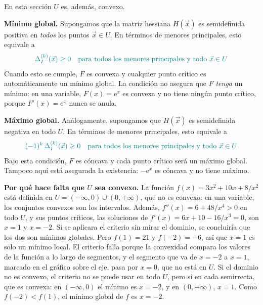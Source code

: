 \documentclass{article}
\newcommand{\vect}[1]{\vec{#1}}
\begin{document}
En esta sección \(U\) es, además, convexo.

\medskip

\noindent\textbf{Mínimo global.}
Supongamos que la matriz hessiana \(H(\vect{x})\) es semidefinida positiva en \emph{todos} los puntos \(\vect{x}\in U\). En términos de menores principales, esto equivale a
\[\color{teal}
\Delta^{(k)}_I(\vect{x})\ge0\quad\text{para todos los menores principales y todo }\vect{x}\in U
\]
Cuando esto se cumple, \(F\) es convexa y cualquier punto crítico es automáticamente un mínimo global. La condición no asegura que \(F\) \emph{tenga} un mínimo: en una variable, \(F(x)=\mathrm{e}^{x}\) es convexa y no tiene ningún punto crítico, porque \(F'(x)=\mathrm{e}^{x}\) nunca se anula.

\medskip

\noindent\textbf{Máximo global.}
Análogamente, supongamos que \(H(\vect{x})\) es semidefinida negativa en todo \(U\). En términos de menores principales, esto equivale a
\[\color{teal}
(-1)^k\,\Delta^{(k)}_I(\vect{x})\ge0\quad\text{para todos los menores principales y todo }\vect{x}\in U
\]
Bajo esta condición, \(F\) es cóncava y cada punto crítico será un máximo global. Tampoco aquí está asegurada la existencia: \(-\mathrm{e}^{x}\) es cóncava y no tiene máximo.

\medskip

\noindent\textbf{Por qué hace falta que \(U\) sea convexo.} La función \(f(x)=3x^2+10x+8/x^2\) está definida en \(U=(-\infty,0)\cup(0,+\infty)\), que no es convexo: en una variable, los conjuntos convexos son los intervalos. Además, \(f''(x)=6+48/x^4>0\) en todo \(U\), y sus puntos críticos, las soluciones de \(f'(x)=6x+10-16/x^3=0\), son \(x=1\) y \(x=-2\). Si se aplicara el criterio sin mirar el dominio, se concluiría que los dos son mínimos globales. Pero \(f(1)=21\) y \(f(-2)=-6\), así que \(x=1\) es solo un mínimo local. El criterio falla porque la convexidad compara los valores de la función a lo largo de segmentos, y el segmento que va de \(x=-2\) a \(x=1\), marcado en el gráfico sobre el eje, pasa por \(x=0\), que no está en \(U\). Si el dominio no es convexo, el criterio no se puede usar en todo \(U\), pero sí en cada semirrecta, que es convexa: en \((-\infty,0)\) el mínimo es \(x=-2\), y en \((0,+\infty)\), \(x=1\). Como \(f(-2)<f(1)\), el mínimo global de \(f\) es \(x=-2\).
\end{document}
